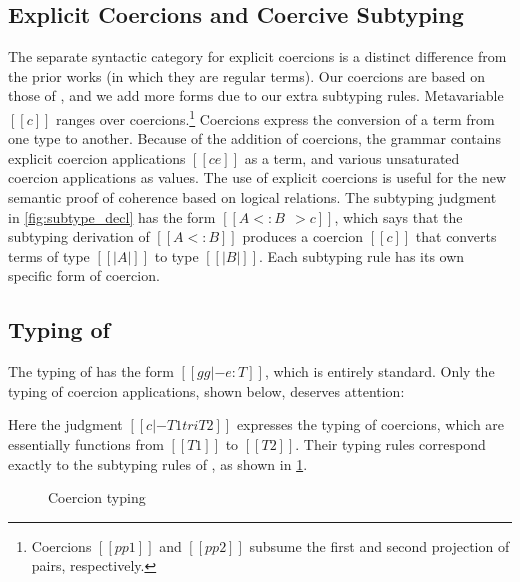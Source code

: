 \subsection{Explicit Coercions and Coercive Subtyping}

The separate syntactic category for explicit coercions is a distinct
difference from the prior works (in which they are regular terms). Our coercions
are based on those of \citet{Henglein_1994}, and we add more forms due to our
extra subtyping rules.
Metavariable $[[c]]$ ranges over coercions.\footnote{Coercions $[[pp1]]$ and $[[pp2]]$ subsume the first and second projection of pairs, respectively.}
Coercions express the conversion
of a term from one type to another. Because of the addition of coercions, the
grammar contains explicit coercion applications $[[c e]]$ as a term, and various
unsaturated coercion applications as values. The use of explicit coercions is useful for the new semantic
proof of coherence based on logical relations.
The subtyping judgment in \cref{fig:subtype_decl} has the form $[[A <: B ~~> c]]$, which says that the
subtyping derivation of $[[A <: B]]$ produces a coercion $[[c]]$ that converts
terms of type $[[ |A| ]]$ to type $[[ |B| ]]$. Each subtyping rule has its own
specific form of coercion.



\subsection{Typing of \tname}

The typing of \tname has the form $[[gg |- e : T]]$, which is entirely standard. Only the typing of coercion
applications, shown below, deserves attention:
\begin{mathpar}
\end{mathpar}
Here the judgment $[[c |- T1 tri T2]]$ expresses the typing of coercions, which
are essentially functions from $[[T1]]$ to $[[T2]]$. Their typing
rules correspond exactly to the subtyping rules of \namee, as
shown in \cref{fig:co}.

\begin{figure}[t]
  \centering
  \caption{Coercion typing}
  \label{fig:co}
\end{figure}


